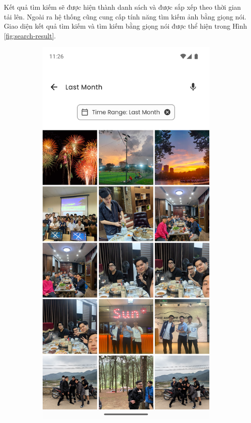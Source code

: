 Kết quả tìm kiếm sẽ được hiện thành danh sách và được sắp xếp theo thời gian tải lên. Ngoài ra hệ thống cũng cung cấp tính năng tìm kiếm ảnh bằng giọng nói. Giao diện kết quả tìm kiếm và tìm kiếm bằng giọng nói được thể hiện trong Hình \ref{fig:search-result}.

\begin{figure}[H]
    \centering
    \begin{subfigure}{0.48\textwidth}
        \includegraphics[width=1\linewidth]{figures/c4/4-2/search_4.png} 

\end{subfigure}
\end{figure}
